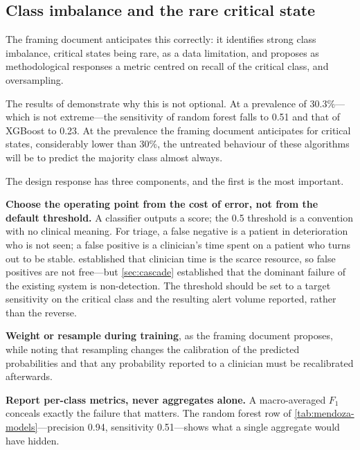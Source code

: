 \documentclass[12pt,a4paper,oneside]{report}
\begin{document}
\subsection{Class imbalance and the rare critical state}\label{sec:imbalance}

The framing document anticipates this correctly: it identifies strong class imbalance, critical states being rare, as a data limitation, and proposes as methodological responses a metric centred on recall of the critical class, and oversampling.

The results of \textcite{mendoza2025} demonstrate why this is not optional. At a prevalence of 30.3\%---which is not extreme---the sensitivity of random forest falls to 0.51 and that of XGBoost to 0.23. At the prevalence the framing document anticipates for critical states, considerably lower than 30\%, the untreated behaviour of these algorithms will be to predict the majority class almost always.

The design response has three components, and the first is the most important.

\textbf{Choose the operating point from the cost of error, not from the default threshold.} A classifier outputs a score; the 0.5 threshold is a convention with no clinical meaning. For triage, a false negative is a patient in deterioration who is not seen; a false positive is a clinician's time spent on a patient who turns out to be stable.  established that clinician time is the scarce resource, so false positives are not free---but \cref{sec:cascade} established that the dominant failure of the existing system is non-detection. The threshold should be set to a target sensitivity on the critical class and the resulting alert volume reported, rather than the reverse.

\textbf{Weight or resample during training}, as the framing document proposes, while noting that resampling changes the calibration of the predicted probabilities and that any probability reported to a clinician must be recalibrated afterwards.

\textbf{Report per-class metrics, never aggregates alone.} A macro-averaged $F_1$ conceals exactly the failure that matters. The random forest row of \cref{tab:mendoza-models}---precision 0.94, sensitivity 0.51---shows what a single aggregate would have hidden.

\end{document}

